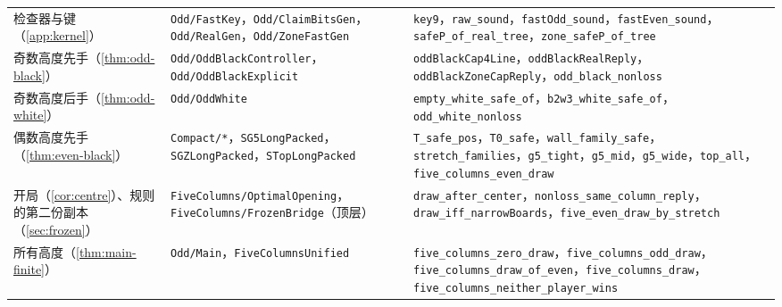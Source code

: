 \documentclass[11pt,a4paper]{article}
\theoremstyle{zhthm}
\newcommand{\code}[1]{{\upshape\texttt{\small\nolinkurl{#1}}}}
\begin{document}
\begin{table}[!htbp]
\begin{tabularx}{\linewidth}{@{}L{3.3cm} L{3.9cm} Y@{}}
检查器与键（\cref{app:kernel}） & \code{Odd/FastKey}，\code{Odd/ClaimBitsGen}，\code{Odd/RealGen}，\code{Odd/ZoneFastGen} & \code{key9}，\code{raw_sound}，\code{fastOdd_sound}，\code{fastEven_sound}，\code{safeP_of_real_tree}，\code{zone_safeP_of_tree} \\
奇数高度先手（\cref{thm:odd-black}） & \code{Odd/OddBlackController}，\code{Odd/OddBlackExplicit} & \code{oddBlackCap4Line}，\code{oddBlackRealReply}，\code{oddBlackZoneCapReply}，\code{odd_black_nonloss} \\
奇数高度后手（\cref{thm:odd-white}） & \code{Odd/OddWhite} & \code{empty_white_safe_of}，\code{b2w3_white_safe_of}，\code{odd_white_nonloss} \\
偶数高度先手（\cref{thm:even-black}） & \code{Compact/*}，\code{SG5LongPacked}，\code{SGZLongPacked}，\code{STopLongPacked} & \code{T_safe_pos}，\code{T0_safe}，\code{wall_family_safe}，\code{stretch_families}，\code{g5_tight}，\code{g5_mid}，\code{g5_wide}，\code{top_all}，\code{five_columns_even_draw} \\
开局（\cref{cor:centre}）、规则的第二份副本（\cref{sec:frozen}） & \code{FiveColumns/OptimalOpening}，\code{FiveColumns/FrozenBridge}（顶层） & \code{draw_after_center}，\code{nonloss_same_column_reply}，\code{draw_iff_narrowBoards}，\code{five_even_draw_by_stretch} \\
所有高度（\cref{thm:main-finite}） & \code{Odd/Main}，\code{FiveColumnsUnified} & \code{five_columns_zero_draw}，\code{five_columns_odd_draw}，\code{five_columns_draw_of_even}，\code{five_columns_draw}，\code{five_columns_neither_player_wins} \\
\bottomrule
\end{tabularx}
\end{table}
\end{document}

